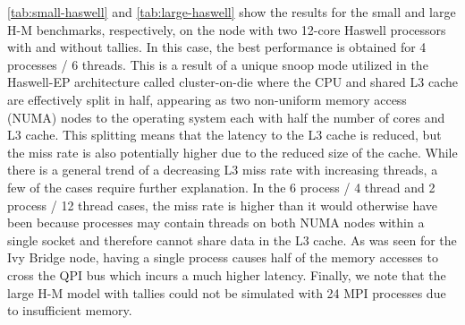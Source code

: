 \documentclass{mc2015}
\begin{document}
\autoref{tab:small-haswell} and \autoref{tab:large-haswell} show the results
for the small and large H-M benchmarks, respectively, on the node with two
12-core Haswell processors with and without tallies. In this case, the best
performance is obtained for 4 processes / 6 threads. This is a result of a
unique snoop mode utilized in the Haswell-EP architecture called cluster-on-die
where the CPU and shared L3 cache are effectively split in half, appearing as
two non-uniform memory access (NUMA) nodes to the operating system each with
half the number of cores and L3 cache. This splitting means that the latency to
the L3 cache is reduced, but the miss rate is also potentially higher due to
the reduced size of the cache. While there is a general trend of a decreasing
L3 miss rate with increasing threads, a few of the cases require further
explanation. In the 6 process / 4 thread and 2 process / 12 thread cases, the
miss rate is higher than it would otherwise have been because processes may
contain threads on both NUMA nodes within a single socket and therefore cannot
share data in the L3 cache. As was seen for the Ivy Bridge node, having a
single process causes half of the memory accesses to cross the QPI bus which
incurs a much higher latency. Finally, we note that the large H-M model with
tallies could not be simulated with 24 MPI processes due to insufficient
memory.
\end{document}
